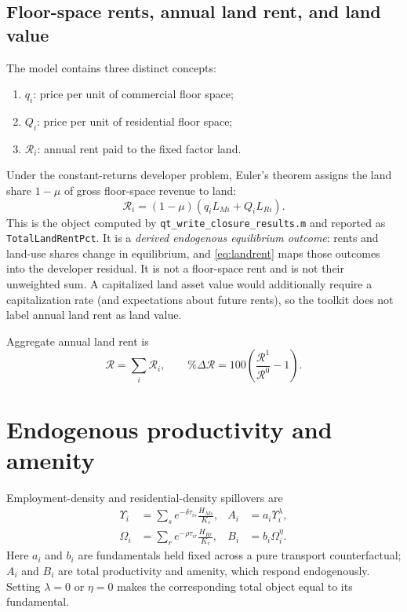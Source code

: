 \documentclass[11pt,a4paper]{article}
\newcommand{\Rland}{\mathcal{R}}
\begin{document}
\subsection{Floor-space rents, annual land rent, and land value}
The model contains three distinct concepts:
\begin{enumerate}
\item $q_i$: price per unit of commercial floor space;
\item $Q_i$: price per unit of residential floor space;
\item $\Rland_i$: annual rent paid to the fixed factor land.
\end{enumerate}
Under the constant-returns developer problem, Euler's theorem assigns the land
share $1-\mu$ of gross floor-space revenue to land:
\begin{equation}
 \boxed{\Rland_i=(1-\mu)
 \left(q_iL_{Mi}+Q_iL_{Ri}\right).}                  \label{eq:landrent}
\end{equation}
This is the object computed by
\texttt{qt\_write\_closure\_results.m} and reported as
\texttt{TotalLandRentPct}. It is a \emph{derived endogenous equilibrium
outcome}: rents and land-use shares change in equilibrium, and
\eqref{eq:landrent} maps those outcomes into the developer residual. It is not
a floor-space rent and is not their unweighted sum. A capitalized land asset
value would additionally require a capitalization rate (and expectations about
future rents), so the toolkit does not label annual land rent as land value.

Aggregate annual land rent is
\begin{equation}
 \Rland=\sum_i\Rland_i,\qquad
 \%\Delta\Rland=100\left(\frac{\Rland^1}{\Rland^0}-1\right). \label{eq:aggland}
\end{equation}

\section{Endogenous productivity and amenity}
Employment-density and residential-density spillovers are
\begin{align}
 \Upsilon_i&=\sum_s e^{-\delta\tau_{is}}\frac{H_{Ms}}{K_s},
 & A_i&=a_i\Upsilon_i^\lambda,\\
 \Omega_i&=\sum_r e^{-\rho\tau_{ir}}\frac{H_{Rr}}{K_r},
 & B_i&=b_i\Omega_i^\eta.                             \label{eq:spillovers}
\end{align}
Here $a_i$ and $b_i$ are fundamentals held fixed across a pure transport
counterfactual; $A_i$ and $B_i$ are total productivity and amenity, which
respond endogenously. Setting $\lambda=0$ or $\eta=0$ makes the corresponding
total object equal to its fundamental.
\end{document}
